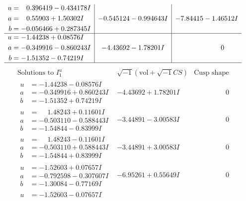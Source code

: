 \documentclass[1p]{elsarticle_modified}
\theoremstyle{definition}
\newcommand{\I}{\sqrt{-1}}
\begin{document}
$$\begin{array}{c|c|c}
\begin{aligned}
u &= \phantom{-}0.396419 - 0.434178 I \\
a &= \phantom{-}0.55903 + 1.50302 I \\
b &= -0.056466 + 0.287345 I\end{aligned}
 & -0.545124 - 0.994643 I & -7.84415 - 1.46512 I \\ \hline\begin{aligned}
u &= -1.44238 + 0.08576 I \\
a &= -0.349916 - 0.860243 I \\
b &= -1.51352 - 0.74219 I\end{aligned}
 & -4.43692 - 1.78201 I & \phantom{-0.000000 } 0\\
 \hline 
 \end{array}$$\newpage$$\begin{array}{c|c|c}  
\text{Solutions to }I^u_{1}& \I (\text{vol} + \sqrt{-1}CS) & \text{Cusp shape}\\
 \hline 
\begin{aligned}
u &= -1.44238 - 0.08576 I \\
a &= -0.349916 + 0.860243 I \\
b &= -1.51352 + 0.74219 I\end{aligned}
 & -4.43692 + 1.78201 I & \phantom{-0.000000 } 0 \\ \hline\begin{aligned}
u &= \phantom{-}1.48243 + 0.11601 I \\
a &= -0.503110 - 0.588443 I \\
b &= -1.54844 - 0.83999 I\end{aligned}
 & -3.44891 - 3.00583 I & \phantom{-0.000000 } 0 \\ \hline\begin{aligned}
u &= \phantom{-}1.48243 - 0.11601 I \\
a &= -0.503110 + 0.588443 I \\
b &= -1.54844 + 0.83999 I\end{aligned}
 & -3.44891 + 3.00583 I & \phantom{-0.000000 } 0 \\ \hline\begin{aligned}
u &= -1.52603 + 0.07657 I \\
a &= -0.792598 - 0.307607 I \\
b &= -1.30084 - 0.77169 I\end{aligned}
 & -6.95261 + 0.55649 I & \phantom{-0.000000 } 0 \\ \hline\begin{aligned}
u &= -1.52603 - 0.07657 I \\

\end{aligned}
\end{array}$$
\end{document}
